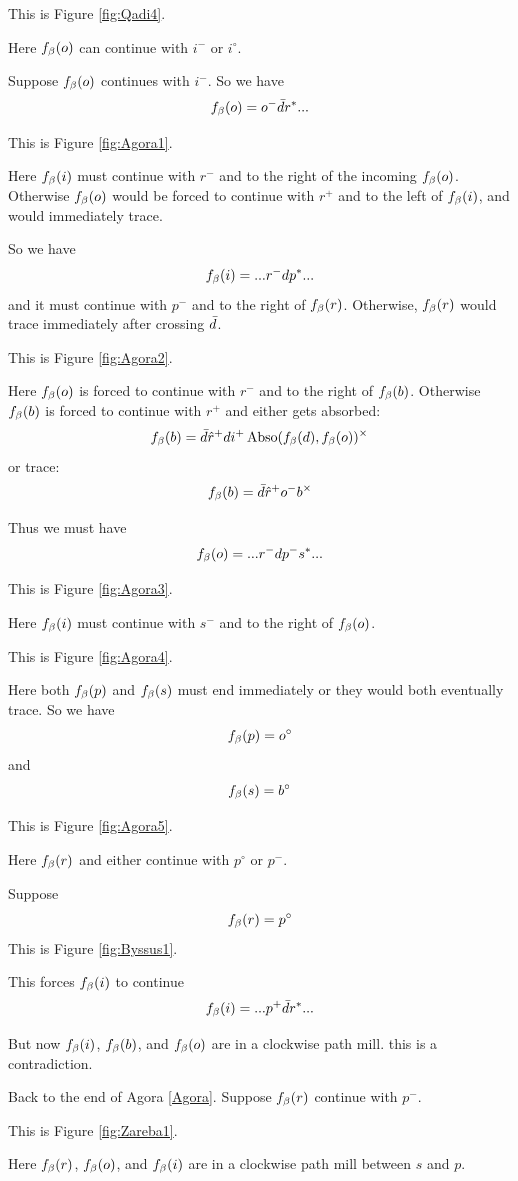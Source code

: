 This is Figure \ref{fig:Qadi4}.

Here $f_\beta(o)$ can continue with $i^-$ or $i^\circ$.

\label{Agora}
Suppose $f_\beta(o)$ continues with $i^-$. So we have
\[
f_\beta(o) = o^- \bar{d} r^*...
\]

This is Figure \ref{fig:Agora1}.

Here $f_\beta(i)$ must continue with $r^-$ and to the right of the incoming $f_\beta(o)$. Otherwise $f_\beta(o)$ would be forced to continue with $r^+$ and to the left of $f_\beta(i)$, and would immediately trace.

So we have
\[
f_\beta(i) = ... r^- d p^*... 
\]
and it must continue with $p^-$ and to the right of $f_\beta(r)$. Otherwise, $f_\beta(r)$ would trace immediately after crossing $\bar{d}$. 

This is Figure \ref{fig:Agora2}.

Here $f_\beta(o)$ is forced to continue with $r^-$ and to the right of $f_\beta(b)$. Otherwise $f_\beta(b)$ is forced to continue with $r^+$ and either gets absorbed:
\[
f_\beta(b) = \bar{d} \hat{r}^+ d i^+ \operatorname{Abso}(f_\beta(d), f_\beta(o))^\times
\]
or trace:
\[
f_\beta(b) = \bar{d} \hat{r}^+ o^- b^\times
\]

Thus we must have
\[
f_\beta(o) = ...r^- d p^- s^*...
\]

This is Figure \ref{fig:Agora3}.

Here $f_\beta(i)$ must continue with $s^-$ and to the right of $f_\beta(o)$. 

This is Figure \ref{fig:Agora4}.

Here both $f_\beta(p)$ and $f_\beta(s)$ must end immediately or they would both eventually trace. So we have
\[
f_\beta(p) = o^\circ
\]
and 
\[
f_\beta(s) = b^\circ
\]

This is Figure \ref{fig:Agora5}.

Here $f_\beta(r)$ and either continue with $p^\circ$ or $p^-$.

\label{Byssus}
Suppose
\[
f_\beta(r) = p^\circ
\]
This is Figure \ref{fig:Byssus1}.

This forces $f_\beta(i)$ to continue
\[
f_\beta(i) = ...p^+ \bar{d} r^*...
\]

But now $f_\beta(i)$, $f_\beta(b)$, and $f_\beta(o)$ are in a clockwise path mill. this is a contradiction.

\label{Zareba}
Back to the end of Agora \ref{Agora}. Suppose $f_\beta(r)$ continue with $p^-$. 

This is Figure \ref{fig:Zareba1}.

Here $f_\beta(r)$, $f_\beta(o)$, and $f_\beta(i)$ are in a clockwise path mill between $s$ and $p$.

